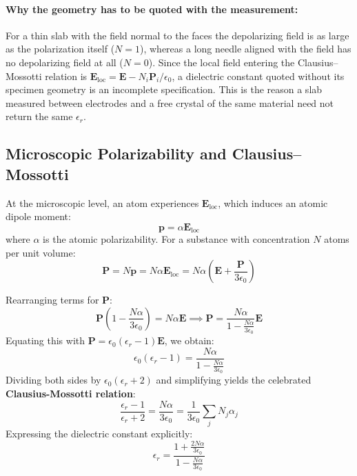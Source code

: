 \documentclass[11pt,a4paper]{article}
\begin{document}
\paragraph{Why the geometry has to be quoted with the measurement:}
For a thin slab with the field normal to the faces the depolarizing field is as large as the polarization itself ($N = 1$), whereas a long needle aligned with the field has no depolarizing field at all ($N = 0$). Since the local field entering the Clausius--Mossotti relation is $\mathbf{E}_{\text{loc}} = \mathbf{E} - N_i\mathbf{P}_i/\epsilon_0$, a dielectric constant quoted without its specimen geometry is an incomplete specification. This is the reason a slab measured between electrodes and a free crystal of the same material need not return the same $\epsilon_r$.

\subsection{Microscopic Polarizability and Clausius--Mossotti}
At the microscopic level, an atom experiences $\mathbf{E}_{\text{loc}}$, which induces an atomic dipole moment:
\begin{equation}
    \mathbf{p} = \alpha \mathbf{E}_{\text{loc}}
\end{equation}
where $\alpha$ is the atomic polarizability. For a substance with concentration $N$ atoms per unit volume:
\begin{equation}
    \mathbf{P} = N \mathbf{p} = N \alpha \mathbf{E}_{\text{loc}} = N \alpha \left( \mathbf{E} + \frac{\mathbf{P}}{3\epsilon_0} \right)
\end{equation}

Rearranging terms for $\mathbf{P}$:
\begin{equation}
    \mathbf{P} \left( 1 - \frac{N\alpha}{3\epsilon_0} \right) = N \alpha \mathbf{E} \implies \mathbf{P} = \frac{N\alpha}{1 - \frac{N\alpha}{3\epsilon_0}} \mathbf{E}
\end{equation}
Equating this with $\mathbf{P} = \epsilon_0 (\epsilon_r - 1) \mathbf{E}$, we obtain:
\begin{equation}
    \epsilon_0 (\epsilon_r - 1) = \frac{N\alpha}{1 - \frac{N\alpha}{3\epsilon_0}}
\end{equation}
Dividing both sides by $\epsilon_0 (\epsilon_r + 2)$ and simplifying yields the celebrated \textbf{Clausius-Mossotti relation}:
\begin{equation}
    \frac{\epsilon_r - 1}{\epsilon_r + 2} = \frac{N\alpha}{3\epsilon_0} = \frac{1}{3\epsilon_0} \sum_j N_j \alpha_j
\end{equation}
Expressing the dielectric constant explicitly:
\begin{equation}
    \epsilon_r = \frac{1 + \frac{2 N \alpha}{3\epsilon_0}}{1 - \frac{N\alpha}{3\epsilon_0}}
\end{equation}
\end{document}
